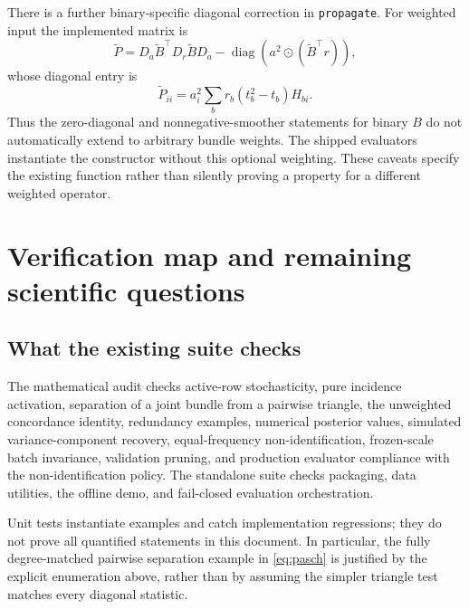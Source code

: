 \documentclass[11pt,a4paper]{article}
\theoremstyle{remark}
\newcommand{\diag}{\operatorname{diag}}
\newcommand{\code}[1]{\texttt{\small #1}}
\begin{document}
There is a further binary-specific diagonal correction in
\code{propagate}. For weighted input the implemented matrix is
\begin{equation}
 \widetilde P=D_a\widetilde B^\top D_r\widetilde B D_a
       -\diag\left(a^2\odot(\widetilde B^\top r)\right),
\end{equation}
whose diagonal entry is
\begin{equation}
 \widetilde P_{ii}=a_i^2\sum_b r_b(t_b^2-t_b)H_{bi}.
\end{equation}
Thus the zero-diagonal and nonnegative-smoother statements for binary
$B$ do not automatically extend to arbitrary bundle weights. The shipped
evaluators instantiate the constructor without this optional weighting.
These caveats specify the existing function rather than silently proving
a property for a different weighted operator.

\section{Verification map and remaining scientific questions}
\subsection{What the existing suite checks}
The mathematical audit checks active-row stochasticity, pure incidence
activation, separation of a joint bundle from a pairwise triangle, the
unweighted concordance identity, redundancy examples, numerical posterior
values, simulated variance-component recovery, equal-frequency
non-identification, frozen-scale batch invariance, validation pruning,
and production evaluator compliance with the non-identification policy.
The standalone suite checks packaging, data utilities, the offline demo,
and fail-closed evaluation orchestration.

Unit tests instantiate examples and catch implementation regressions;
they do not prove all quantified statements in this document. In
particular, the fully degree-matched pairwise separation example in
\eqref{eq:pasch} is justified by the explicit enumeration above, rather
than by assuming the simpler triangle test matches every diagonal statistic.
\end{document}
